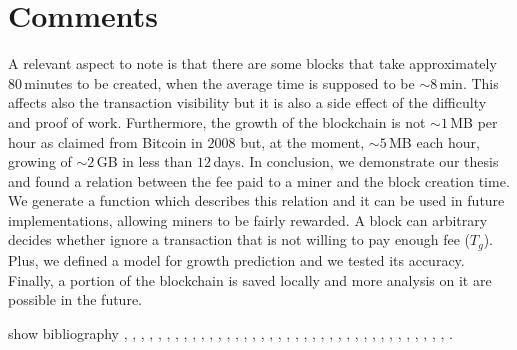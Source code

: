 \documentclass[USenglish]{uit-thesis}
\begin{document}
\section{Comments}
\label{sec:comments}
A relevant aspect to note is that there are some blocks
that take approximately $80$\,minutes to be created, when the
average time is supposed to be $\sim8$\,min. This affects also the
transaction visibility but it is also a side effect of the difficulty
and proof of work. Furthermore, the growth of the blockchain
is not $\sim1$\,MB per hour as claimed from Bitcoin in $2008$
but, at the moment, $\sim5$\,MB each hour, growing of $\sim2$\,GB in less than $12$\,days.
In conclusion, we demonstrate our thesis and found a relation between the fee paid to a miner
and the block creation time. We generate a function which describes this relation and it can
be used in future implementations, allowing miners to be fairly rewarded.
A block can arbitrary decides whether ignore a transaction
that is not willing to pay enough fee ($T_g$).
Plus, we defined a model for growth prediction and we tested its accuracy. Finally, a portion of
the blockchain is saved locally and more analysis on it are possible in the future.

show bibliography \cite{Nakamoto_bitcoin}, \cite{ethereum}, \cite{Back02hashcash},
\cite{Dwork:1992}, \cite{Luu:2016}, \cite{Delmolino2016},
\cite{ethereum_white_paper}, \cite{ethereum_solidity}, \cite{Luu:2015:DIC},
\cite{sha}, \cite{Hopcroft:2006:IAT}, \cite{Johansen2015Fireflies}, \cite{bitcoinmining},
\cite{Garcia:2011:EMB}, \cite{vandiver2007hrdb},
\cite{Luiz:2014:MBF}, \cite{bitcoin_api}, \cite{ethereum_api}, \cite{merkle_tree}, \cite{ethereum_wiki_patricia_tree},
\cite{swan2015blockchain}, \cite{Baran1964:ODC}, \cite{Stallings:2002:CNS}, \cite{bitcoin_blockchain}, \cite{ethereum_bc_analysis},
\cite{ethereum_blockchain}, \cite{bitcoinmining_process},
\cite{tradeblock}, \cite{ethereum_website}, \cite{Larman:2004:AUP},
\cite{Aho:1992:FCS}, \cite{matplotlib}, \cite{croman2016}, \cite{DBLP:journals/corr/EyalGSR15},
\cite{Hildebrand:1987:INA}, \cite{mining_hw}, \cite{hashing_rate}, \cite{bitnodes}, \cite{Rizun:2015:blocksizelimit}.




\end{document}
